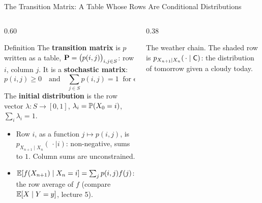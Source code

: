 \begin{frame}{The Transition Matrix: A Table Whose Rows Are Conditional Distributions}
  \label{fr:tm}
  \small
  \begin{columns}[T]
    \begin{column}{0.60\textwidth}
      \begin{block}{Definition}
        The \textbf{transition matrix} is $p$ written as a table, $\mathbf{P}=\big(p(i,j)\big)_{i,j\in S}$: row $i$, column $j$. It is a \textbf{stochastic matrix}:
        \[
          p(i,j)\ge0\quad\text{and}\quad\sum_{j\in S}p(i,j)=1\ \text{ for every } i\in S .
        \]
        The \textbf{initial distribution} is the row vector $\lambda\colon S\to[0,1]$, $\lambda_i=\mathbb{P}(X_0=i)$, $\sum_i\lambda_i=1$.
      \end{block}
      \begin{itemize}
        \item Row $i$, as a function $j\mapsto p(i,j)$, is $p_{X_{n+1}\mid X_n}(\,\cdot\mid i)$: non-negative, sums to $1$. Column sums are unconstrained.
        \item $\mathbb{E}[f(X_{n+1})\mid X_n=i]=\sum_j p(i,j)f(j)$: the row average of $f$ (compare $\mathbb{E}[X\mid Y=y]$, lecture 5).
      \end{itemize}
    \end{column}
    \begin{column}{0.38\textwidth}
      \centering
      \par\medskip
      {\footnotesize The weather chain. The shaded row is $p_{X_{n+1}\mid X_n}(\,\cdot\mid\mathsf{C})$: the distribution of tomorrow given a cloudy today.}
    \end{column}
  \end{columns}
\end{frame}

